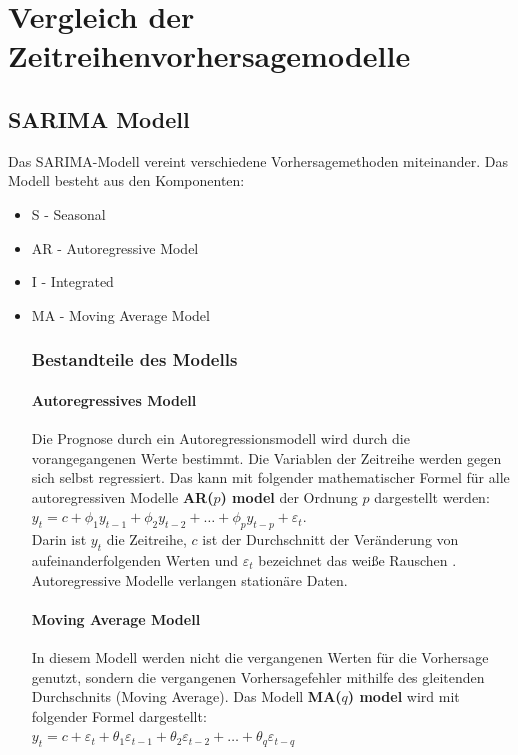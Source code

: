 \documentclass[12pt]{report}
\begin{document}
	\chapter{Vergleich der Zeitreihenvorhersagemodelle}
	\section{SARIMA Modell}
	Das SARIMA-Modell vereint verschiedene Vorhersagemethoden miteinander. Das Modell besteht aus den Komponenten:
	\begin{itemize}
		\item S - Seasonal
		\item AR - Autoregressive Model
		\item I - Integrated
		\item MA - Moving Average Model
	\subsection{Bestandteile des Modells}
	
	\subsubsection{Autoregressives Modell}
	Die Prognose durch ein Autoregressionsmodell wird durch die vorangegangenen Werte bestimmt. Die Variablen der Zeitreihe werden gegen sich selbst regressiert. Das kann mit folgender mathematischer Formel für alle autoregressiven Modelle \textbf{AR($p$) model} der Ordnung $p$ dargestellt werden:\\
	$y_{t} = c + \phi_{1}y_{t-1} + \phi_{2}y_{t-2} + \dots + \phi_{p}y_{t-p} + \varepsilon_{t}$.\\
	Darin ist $y_{t}$ die Zeitreihe, $c$ ist der Durchschnitt der Veränderung von aufeinanderfolgenden Werten und $\varepsilon_{t}$ bezeichnet das weiße Rauschen \cite[Kapitel 8.1, 8.3]{Hyndman.May2018}.\\
	Autoregressive Modelle verlangen stationäre Daten. 
	\subsubsection{Moving Average Modell}
	In diesem Modell werden nicht die vergangenen Werten für die Vorhersage genutzt, sondern die vergangenen Vorhersagefehler mithilfe des gleitenden Durchschnits (Moving Average)\cite[Kapitel 8.4]{Hyndman.May2018}. Das Modell \textbf{MA($q$) model} wird mit folgender Formel dargestellt:\\
	$y_{t} = c + \varepsilon_t + \theta_{1}\varepsilon_{t-1} + \theta_{2}\varepsilon_{t-2} + \dots + \theta_{q}\varepsilon_{t-q}$
	
	\end{itemize}
	
\end{document}
